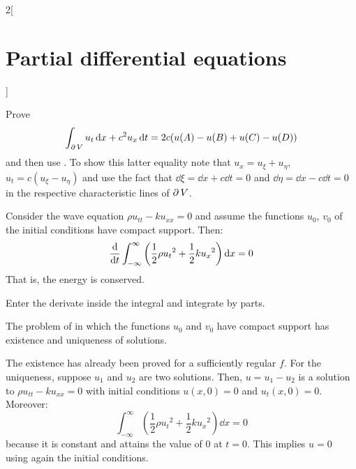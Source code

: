 \documentclass[../../../main_math.tex]{subfiles}
\begin{document}
\begin{multicols}{2}[\section{Partial differential equations}]
\begin{sproof}
    Prove $$\int_{\operatorname{\partial}{V}}u_t\dd{x}+c^2 u_x\dd{t}=2c(u(A)-u(B)+u(C)-u(D))$$ and then use . To show this latter equality note that $u_x=u_\xi+u_\eta$, $u_t=c(u_\xi-u_\eta)$ and use the fact that $\dd{\xi}=\dd{x}+c\dd{t}=0$ and $\dd{\eta}=\dd{x}-c\dd{t}=0$ in the respective characteristic lines of $\operatorname{\partial}{V}$.
  \end{sproof}
  \begin{center}
    \begin{minipage}{\linewidth}
      \centering
      
      \label{PDE:waves-char}
    \end{minipage}
  \end{center}
  \begin{proposition}
    Consider the wave equation $\rho u_{tt}-ku_{xx}=0$ and assume the functions $u_0$, $v_0$ of the initial conditions have compact support. Then: $$\dv{}{t}\int_{-\infty}^\infty\left(\frac{1}{2}\rho{u_t}^2+\frac{1}{2}k{u_x}^2\right)\dd{x}=0$$ That is, the energy is conserved.
  \end{proposition}
  \begin{sproof}
    Enter the derivate inside the integral and integrate by parts.
  \end{sproof}
  \begin{corollary}
    The problem of  in which the functions $u_0$ and $v_0$ have compact support has existence and uniqueness of solutions.
  \end{corollary}
  \begin{sproof}
    The existence has already been proved for a sufficiently regular $f$. For the uniqueness, suppose $u_1$ and $u_2$ are two solutions. Then, $u=u_1-u_2$ is a solution to $\rho u_{tt}-ku_{xx}=0$ with initial conditions $u(x,0)=0$ and $u_t(x,0)=0$. Moreover: $$\int_{-\infty}^\infty\left(\frac{1}{2}\rho{u_t}^2+\frac{1}{2}k{u_x}^2\right)\dd{x}=0$$ because it is constant and attains the value of 0 at $t=0$. This implies $u=0$ using again the initial conditions.
  \end{sproof}

\end{multicols}
\end{document}
